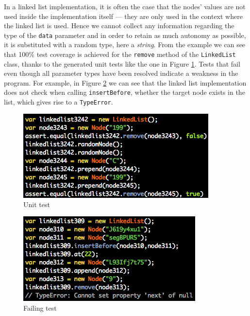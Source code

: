 In a linked list implementation, it is often the case that the nodes' values are not used inside the implementation itself --- they are only used in the context where the linked list is used. Hence we cannot collect any information regarding the type of the \texttt{data} parameter and in order to retain as much autonomy as possible, it is substituted with a random type, here a \emph{string}. From the example we can see that 100\% test coverage is achieved for the \texttt{remove} method of the \texttt{LinkedList} class, thanks to the generated unit tests like the one in Figure \ref{testexample}. Tests that fail even though all parameter types have been resolved indicate a weakness in the program. For example, in Figure \ref{failingtest} we can see that the linked list implementation does not check when calling \texttt{insertBefore}, whether the target node exists in the list, which gives rise to a \texttt{TypeError}.\\


\begin{figure}[b]
\centering
\includegraphics[scale=0.6]{./components/chapter3/linkedlisttest.png}
\caption{Unit test}
\label{testexample}
\end{figure}

\begin{figure}[t]
\centering
\includegraphics[scale=0.6]{./components/chapter3/linkedlistfail.png}
\caption{Failing test}
\label{failingtest}
\end{figure}

